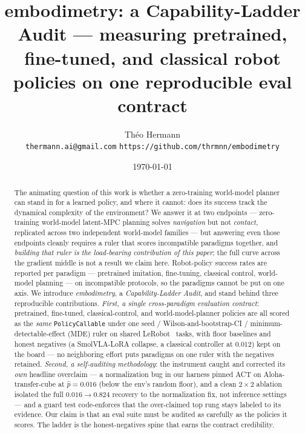 \documentclass[10pt]{article}
\title{\vspace{-1.5ex}embodimetry: a Capability-Ladder Audit ---
measuring pretrained, fine-tuned, and classical robot policies on one
reproducible eval contract\vspace{-0.5ex}}
\author{Th\'eo Hermann\\
\texttt{thermann.ai@gmail.com} \quad
\texttt{https://github.com/thrmnn/embodimetry}}
\date{\vspace{-2ex}\today\vspace{-1ex}}
\begin{document}
\maketitle


\begin{abstract}
The animating question of this work is whether a zero-training world-model
planner can stand in for a learned policy, and where it cannot: does its
success track the dynamical complexity of the environment? We answer it at
two endpoints --- zero-training world-model latent-MPC planning solves
\emph{navigation} but not \emph{contact}, replicated across two independent
world-model families --- but answering even those endpoints cleanly
requires a ruler that scores incompatible paradigms together, and
\emph{building that ruler is the load-bearing contribution of this paper};
the full curve across the gradient middle is not a result we claim here.
Robot-policy success rates are reported per
paradigm --- pretrained imitation, fine-tuning, classical control,
world-model planning --- on incompatible protocols, so the paradigms
cannot be put on one axis. We introduce \emph{embodimetry}, a
\emph{Capability-Ladder Audit}, and stand behind three
reproducible contributions. \emph{First, a single cross-paradigm
evaluation contract}: pretrained, fine-tuned, classical-control, and
world-model-planner policies are all scored as the \emph{same}
\texttt{PolicyCallable} under one seed / Wilson-and-bootstrap-CI /
minimum-detectable-effect (MDE) ruler on shared
LeRobot~\cite{cadene2024lerobot} tasks, with floor baselines and honest
negatives (a SmolVLA-LoRA collapse, a classical controller at $0.012$)
kept on the board --- no neighboring effort puts paradigms on one ruler
with the negatives retained. \emph{Second, a self-auditing methodology}:
the instrument caught and corrected its \emph{own} headline overclaim ---
a normalization bug in our harness pinned ACT on Aloha-transfer-cube at
$\hat{p}{=}0.016$ (below the env's random floor), and a clean $2{\times}2$
ablation isolated the full $0.016\to0.824$ recovery to the normalization
fix, not inference settings --- and a guard test code-enforces that the
over-claimed top rung stays labeled to its evidence. Our claim is that an
eval suite must be audited as carefully as the policies it scores. The
ladder is the honest-negatives spine that earns the contract credibility.

\end{abstract}
\end{document}
